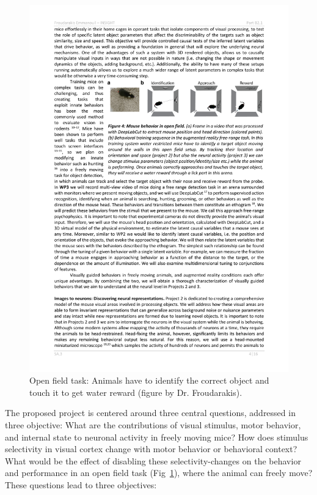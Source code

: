 \documentclass[B2,COG]{ercgrant}
\begin{document}
\begin{figure}
\vspace{-4ex}
\includegraphics[width=\linewidth,trim=0 15 0 5, clip]{figures/openfield_ar.pdf}
\caption{Open field task: Animals have to identify the correct object and touch it to get water reward (figure by Dr. Froudarakis).}
\label{fig:openfield}
\end{figure}
The proposed project is centered around three central questions, addressed in three objective:
 What are the contributions of visual stimulus, motor behavior, and internal state to neuronal activity in freely moving mice?
 How does stimulus selectivity in visual cortex change with motor behavior or behavioral context?
 What would be the effect of disabling these selectivity-changes on the behavior and performance in an open field task (Fig~\ref{fig:openfield}), where the animal can freely move?
These questions lead to three objectives:
\end{document}
